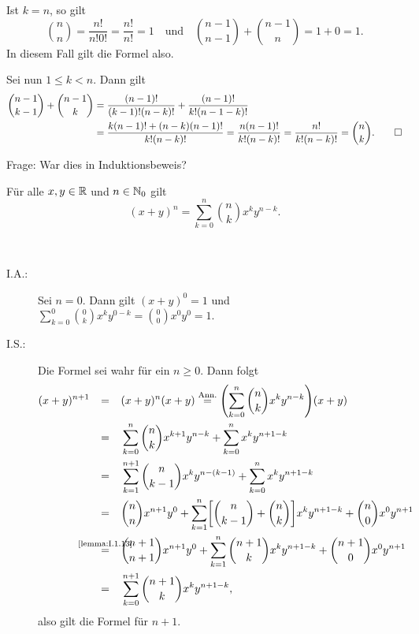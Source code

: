 \begin{beweis}
	Ist $k = n$, so gilt
	\[
		\binom{n}{n} = \frac{n!}{n! 0!} = \frac{n!}{n!} = 1 \quad \text{und} \quad \binom{n-1}{n-1} + \binom{n-1}{n} = 1 + 0 = 1.
	\]
	In diesem Fall gilt die Formel also.
	
	Sei nun $1 \leq k < n$.
	Dann gilt
	\begin{align*}
		\binom{n-1}{k-1} + \binom{n-1}{k} &= \frac{(n-1)!}{(k-1)!(n-k)!} + \frac{(n-1)!}{k!(n-1-k)!} \\
		&= \frac{k(n-1)! + (n-k)(n-1)!}{k!(n-k)!} = \frac{n(n-1)!}{k!(n-k)!} = \frac{n!}{k!(n-k)!} = \binom{n}{k}. \qedhere
	\end{align*}
\end{beweis}

Frage: War dies in Induktionsbeweis?

\begin{satz}
	\label{satz:1.14}
	Für alle $x,y \in \mathbb{R}$ und $n \in \mathbb{N}_0$ gilt
	\[
		(x+y)^n = \sum_{k=0}^{n} \binom{n}{k} x^k y^{n-k}.
	\]
\end{satz}

\begin{beweis}
	\mbox{} \\[-.9cm]
	\begin{description}
		\item[I.A.:] Sei $n=0$.
		Dann gilt $(x+y)^0 = 1$ und $\sum_{k=0}^{0} \binom{0}{k} x^k y^{0-k} = \binom{0}{0} x^0 y^0 = 1$.
		\item[I.S.:] Die Formel sei wahr für ein $n \geq 0$.
		Dann folgt
		\begin{align*}
			(x+y)^{n+1} &\stack{}{=} (x+y)^n (x+y) \stackrel{\text{Ann.}}{=} \enb{\sum_{k=0}^{n} \binom{n}{k} x^k y^{n-k}}(x+y) \\
			&\stack{}{=} \sum_{k=0}^{n} \binom{n}{k} x^{k+1}y^{n-k} + \sum_{k=0}^{n} x^k y^{n+1-k} \\
			&\stack{}{=} \sum_{k=1}^{n+1} \binom{n}{k-1} x^{k}y^{n-(k-1)} + \sum_{k=0}^{n} x^k y^{n+1-k} \\
			&\stack{}{=} \binom{n}{n} x^{n+1} y^0 + \sum_{k=1}^{n} \benb{\binom{n}{k-1} + \binom{n}{k}} x^k y^{n+1-k} + \binom{n}{0} x^0 y^{n+1} \\
			&\stack{\text{\ref{lemma:I.1.13}}}{=} \binom{n+1}{n+1} x^{n+1} y^0 + \sum_{k=1}^{n} \binom{n+1}{k} x^k y^{n+1-k} + \binom{n+1}{0} x^0 y^{n+1} \\
			&\stack{}{=} \sum_{k=0}^{n+1} \binom{n+1}{k} x^k y^{n+1-k},
		\end{align*}
		also gilt die Formel für $n+1$. \qedhere
	\end{description}
	\qedhere
\end{beweis}

\newpage